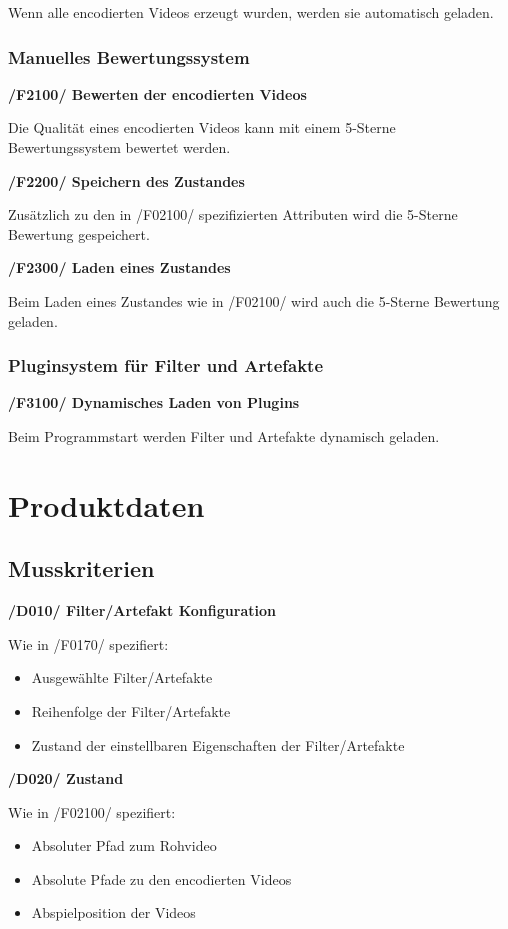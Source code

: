 \documentclass[parskip=full]{scrartcl}
\begin{document}
Wenn alle encodierten Videos erzeugt wurden, werden sie automatisch geladen.
\newpage
\subsubsection{Manuelles Bewertungssystem}
\textbf{/F2100/ Bewerten der encodierten Videos}

Die Qualität eines encodierten Videos kann mit einem 5-Sterne Bewertungssystem bewertet werden.

\textbf{/F2200/ Speichern des Zustandes}

Zusätzlich zu den in /F02100/ spezifizierten Attributen wird die 5-Sterne Bewertung gespeichert.

\textbf{/F2300/ Laden eines Zustandes}

Beim Laden eines Zustandes wie in /F02100/ wird auch die 5-Sterne Bewertung geladen.


\subsubsection{Pluginsystem für Filter und Artefakte}

\textbf{/F3100/ Dynamisches Laden von Plugins}

Beim Programmstart werden Filter und Artefakte dynamisch geladen.



\newpage
\section{Produktdaten}
\subsection{Musskriterien}
\textbf{/D010/ Filter/Artefakt Konfiguration}

Wie in /F0170/ spezifiert:
\begin{itemize}
\item Ausgewählte Filter/Artefakte
\item Reihenfolge der Filter/Artefakte
\item Zustand der einstellbaren Eigenschaften der Filter/Artefakte
\end{itemize}

\textbf{/D020/ Zustand}

Wie in /F02100/ spezifiert:
\begin{itemize}
\item Absoluter Pfad zum Rohvideo
\item Absolute Pfade zu den encodierten Videos
\item Abspielposition der Videos
\end{itemize}
\end{document}
